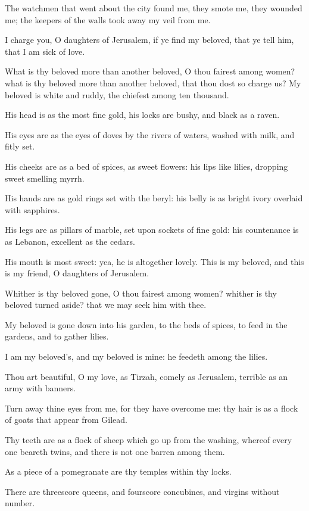 \Verse The watchmen that went about the city found me, they smote me, they wounded me; the keepers of the walls took away my veil from me.

\Verse I charge you, O daughters of Jerusalem, if ye find my beloved, that ye tell him, that I am sick of love.

\Verse What is thy beloved more than another beloved, O thou fairest among women? what is thy beloved more than another beloved, that thou dost so charge us?  \Verse My beloved is white and ruddy, the chiefest among ten thousand.

\Verse His head is as the most fine gold, his locks are bushy, and black as a raven.

\Verse His eyes are as the eyes of doves by the rivers of waters, washed with milk, and fitly set.

\Verse His cheeks are as a bed of spices, as sweet flowers: his lips like lilies, dropping sweet smelling myrrh.

\Verse His hands are as gold rings set with the beryl: his belly is as bright ivory overlaid with sapphires.

\Verse His legs are as pillars of marble, set upon sockets of fine gold: his countenance is as Lebanon, excellent as the cedars.

\Verse His mouth is most sweet: yea, he is altogether lovely. This is my beloved, and this is my friend, O daughters of Jerusalem.


\Chapter
\Verse Whither is thy beloved gone, O thou fairest among women? whither is thy beloved turned aside? that we may seek him with thee.

\Verse My beloved is gone down into his garden, to the beds of spices, to feed in the gardens, and to gather lilies.

\Verse I am my beloved's, and my beloved is mine: he feedeth among the lilies.

\Verse Thou art beautiful, O my love, as Tirzah, comely as Jerusalem, terrible as an army with banners.

\Verse Turn away thine eyes from me, for they have overcome me: thy hair is as a flock of goats that appear from Gilead.

\Verse Thy teeth are as a flock of sheep which go up from the washing, whereof every one beareth twins, and there is not one barren among them.

\Verse As a piece of a pomegranate are thy temples within thy locks.

\Verse There are threescore queens, and fourscore concubines, and virgins without number.

